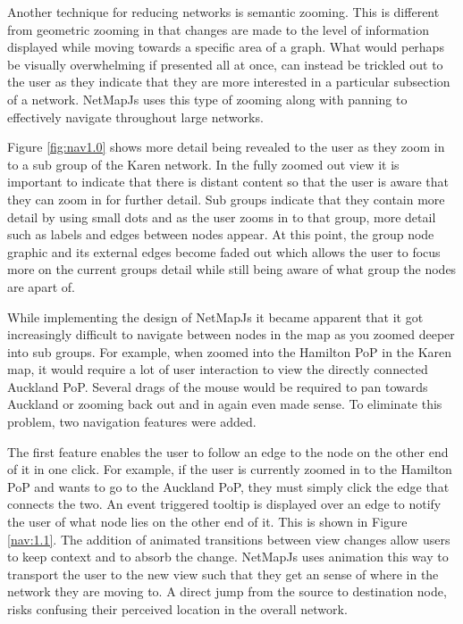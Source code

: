 \documentclass[11pt, a4paper]{article}
\begin{document}
Another technique for reducing networks is semantic zooming.\cite{Perlin_1993}
This is different from geometric zooming in that changes are made to the level
of information displayed while moving towards a specific area of a graph. What
would perhaps be visually overwhelming if presented all at once, can instead be
trickled out to the user as they indicate that they are more interested in a
particular subsection of a network. NetMapJs uses this type of zooming along
with panning to effectively navigate throughout large networks. 

Figure \ref{fig:nav1.0} shows more detail being revealed to the user as they
zoom in to a sub group of the Karen network. In the fully zoomed out view it is
important to indicate that there is distant content so that the user is aware
that they can zoom in for further detail.\cite{Spence_2007} Sub groups indicate
that they contain more detail by using small dots and as the user zooms in to
that group, more detail such as labels and edges between nodes appear. At this
point, the group node graphic and its external edges become faded out which
allows the user to focus more on the current groups detail while still being
aware of what group the nodes are apart of.

While implementing the design of NetMapJs it became apparent that it got
increasingly difficult to navigate between nodes in the map as you zoomed deeper
into sub groups. For example, when zoomed into the Hamilton PoP in the Karen
map, it would require a lot of user interaction to view the directly connected
Auckland PoP. Several drags of the mouse would be required to pan towards
Auckland or zooming back out and in again even made sense. To eliminate this
problem, two navigation features were added.

The first feature enables the user to follow an edge to the node on the other
end of it in one click. For example, if the user is currently zoomed in to the
Hamilton PoP and wants to go to the Auckland PoP, they must simply click the
edge that connects the two. An event triggered tooltip is displayed over an edge
to notify the user of what node lies on the other end of it. This is shown in
Figure \ref{nav:1.1}. The addition of animated transitions between view changes
allow users to keep context and to absorb the change.\cite{Lamping_1995}
NetMapJs uses animation this way to transport the user to the new view such that
they get an sense of where in the network they are moving to. A direct jump from
the source to destination node, risks confusing their perceived location in the
overall network.
\end{document}
